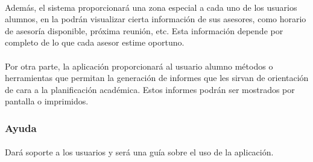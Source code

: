       \paragraph{}Además, el sistema proporcionará una zona especial
      a cada uno de los usuarios alumnos, en la podrán visualizar cierta
      información de sus asesores, como horario de asesoría disponible, próxima
      reunión, etc. Esta información depende por completo de lo que cada asesor
      estime oportuno.

      \paragraph{}Por otra parte, la aplicación proporcionará al usuario alumno
      métodos o herramientas que permitan la generación de informes que les
      sirvan de orientación de cara a la planificación académica. Estos informes
      podrán ser mostrados por pantalla o imprimidos.

      \subsubsection{Ayuda}

      \paragraph{}Dará soporte a los usuarios y será una guía sobre el uso de
      la aplicación.